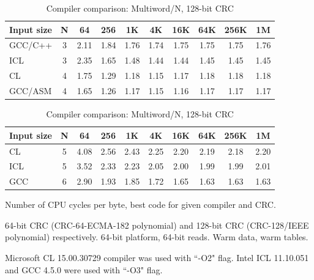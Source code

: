 \documentclass{article}
\begin{document}
\begin{table}
\begin{center}

\caption{Compiler comparison: Multiword/N, 64-bit CRC} \label{t:CompilerComparison64}
\begin{tabular}{| l | c | c | c | c | c | c | c | c | c |}
  \hline
Input size        & N & 64   & 256   & 1K    & 4K    & 16K   & 64K   & 256K  & 1M       \\
  \hline
          GCC/C++ & 3 & 2.11 &  1.84 &  1.76 &  1.74 &  1.75 &  1.75 &  1.75 &  1.76    \\
              ICL & 3 & 2.35 &  1.65 &  1.48 &  1.44 &  1.44 &  1.45 &  1.45 &  1.45    \\
               CL & 4 & 1.75 &  1.29 &  1.18 &  1.15 &  1.17 &  1.18 &  1.18 &  1.18    \\
          GCC/ASM & 4 & 1.65 &  1.26 &  1.17 &  1.15 &  1.16 &  1.17 &  1.17 &  1.17    \\
  \hline
\end{tabular}
{}

\caption{Compiler comparison: Multiword/N, 128-bit CRC} \label{t:CompilerComparison128}
\begin{tabular}{| l | c | c | c | c | c | c | c | c | c |}
  \hline
Input size       & N & 64    & 256   & 1K    & 4K    & 16K   & 64K   & 256K  & 1M       \\
  \hline
              CL & 5 &  4.08 &  2.56 &  2.43 &  2.25 &  2.20 &  2.19 &  2.18 &  2.20    \\
             ICL & 5 &  3.52 &  2.33 &  2.23 &  2.05 &  2.00 &  1.99 &  1.99 &  2.01    \\
             GCC & 6 &  2.90 &  1.93 &  1.85 &  1.72 &  1.65 &  1.63 &  1.63 &  1.63    \\
  \hline
\end{tabular}
{}
\end{center}

Number of CPU cycles per byte, best code for given compiler and CRC.

64-bit CRC (CRC-64-ECMA-182 polynomial) and 128-bit CRC (CRC-128/IEEE
polynomial) respectively. 64-bit platform, 64-bit reads. Warm data, warm
tables.

Microsoft CL 15.00.30729 compiler was used with ``-O2" flag. Intel ICL
11.10.051 and GCC 4.5.0 were used with ``-O3" flag.


\end{table}
\end{document}
